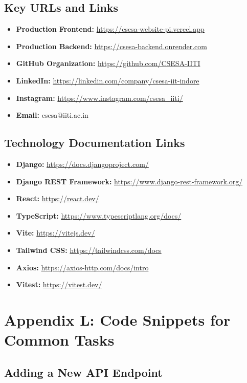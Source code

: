 \documentclass[11pt,a4paper]{article}
\begin{document}
\subsection{Key URLs and Links}
\begin{itemize}[leftmargin=*]
    \item \textbf{Production Frontend:} \url{https://csesa-website-pi.vercel.app}
    \item \textbf{Production Backend:} \url{https://csesa-backend.onrender.com}
    \item \textbf{GitHub Organization:} \url{https://github.com/CSESA-IITI}
    \item \textbf{LinkedIn:} \url{https://linkedin.com/company/csesa-iit-indore}
    \item \textbf{Instagram:} \url{https://www.instagram.com/csesa_iiti/}
    \item \textbf{Email:} csesa@iiti.ac.in
\end{itemize}

\subsection{Technology Documentation Links}
\begin{itemize}[leftmargin=*]
    \item \textbf{Django:} \url{https://docs.djangoproject.com/}
    \item \textbf{Django REST Framework:} \url{https://www.django-rest-framework.org/}
    \item \textbf{React:} \url{https://react.dev/}
    \item \textbf{TypeScript:} \url{https://www.typescriptlang.org/docs/}
    \item \textbf{Vite:} \url{https://vitejs.dev/}
    \item \textbf{Tailwind CSS:} \url{https://tailwindcss.com/docs}
    \item \textbf{Axios:} \url{https://axios-http.com/docs/intro}
    \item \textbf{Vitest:} \url{https://vitest.dev/}
\end{itemize}

\section{Appendix L: Code Snippets for Common Tasks}

\subsection{Adding a New API Endpoint}
\end{document}
